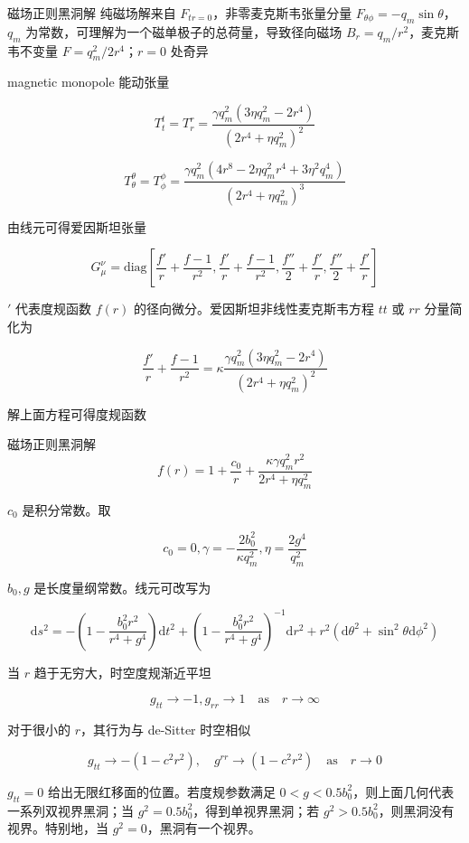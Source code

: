 \documentclass[9pt, dvipsnames]{beamer} %
\begin{document}
\begin{frame}{磁场正则黑洞解 }
    纯磁场解来自 $F_{tr=0} $，非零麦克斯韦张量分量 $F_{\theta\phi}=-q_m \sin\theta $，$q_m $ 为常数，可理解为一个磁单极子的总荷量，导致径向磁场 $B_r=q_m/r^2 $，麦克斯韦不变量 $F=q_m^2/2r^4 $；$r=0 $ 处奇异

    magnetic monopole 能动张量
    
    $$
    T_t^t
    =T_r^r
    =\frac{\gamma q_m^2\left(3\eta q_m^2-2r^4 \right) }{\left(2r^4+\eta q_m^2 \right)^2 }
    $$
    
    $$
    T_\theta^\theta
    =T_\phi^\phi
    =\frac{\gamma q_m^2\left(4 r^8-2\eta q_m^2 r^4+3\eta^2q_m^4 \right) }{\left(2r^4+\eta q_m^2 \right)^3 }
    $$
    
    由线元可得爱因斯坦张量
    
    $$
    G_\mu^\nu
    =\mathrm{diag}\left[\frac{f' }{r } + \frac{f-1 }{r^2 } ,\frac{f' }{r } + \frac{f-1 }{r^2 } , \frac{f'' }{2 } + \frac{f' }{r } , \frac{f'' }{2 } + \frac{f' }{r }  \right]
    $$
    
    $' $ 代表度规函数 $f(r) $ 的径向微分。爱因斯坦非线性麦克斯韦方程 $tt $ 或 $rr $ 分量简化为
    
    $$
    \frac{f' }{r } + \frac{f-1 }{r^2 } 
    =\kappa \frac{\gamma q_m^2\left(3\eta q_m^2-2r^4 \right) }{\left(2r^4+\eta q_m^2 \right)^2 }
    $$
    
    解上面方程可得度规函数
\end{frame}

\begin{frame}{磁场正则黑洞解}
    $$
    f(r)
    =1+\frac{c_0 }{r } + \frac{\kappa \gamma q_m^2 r^2 }{2r^4+\eta q_m^2 } 
    $$
    
    $c_0 $ 是积分常数。取
    
    $$
    c_0=0,
    \gamma=-\frac{2b_0^2 }{\kappa q_m^2} ,
    \eta=\frac{2g^4 }{q_m^2 }
    $$
    
    $b_0,g $ 是长度量纲常数。线元可改写为
    
    $$
    \mathrm{d}s^2
    =-\left(1-\frac{b_0^2r^2 }{r^4+g^4 }  \right)\mathrm{d}t^2 + \left(1-\frac{b_0^2r^2 }{r^4+g^4 }  \right)^{-1}\mathrm{d}r^2 + r^2\left(\mathrm{d}\theta^2+\sin^2\theta \mathrm{d}\phi^2 \right)
    $$
    
    当 $r$ 趋于无穷大，时空度规渐近平坦
    
    $$
    g_{tt}\to -1,g_{rr}\to 1 \quad \mathrm{as}\quad r\to\infty
    $$
    
    对于很小的 $r$，其行为与 de-Sitter 时空相似
    
    $$
    g_{tt}\to -\left(1-c^2r^2 \right),\quad g^{rr} \to \left(1-c^2r^2 \right)\quad \mathrm{as}\quad r\to 0
    $$
    
    $g_{tt}=0$ 给出无限红移面的位置。若度规参数满足 $0<g<0.5 b_0^2 $，则上面几何代表一系列双视界黑洞；当 $g^2=0.5b_0^2$，得到单视界黑洞；若 $g^2>0.5b_0^2$，则黑洞没有视界。特别地，当 $g^2=0$，黑洞有一个视界。
\end{frame}
\end{document}
